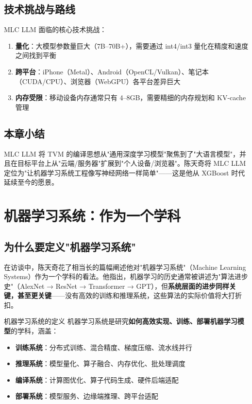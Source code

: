 \documentclass[a4paper]{article}
\begin{document}
\subsection{技术挑战与路线}

MLC LLM 面临的核心技术挑战：

\begin{enumerate}
\item \textbf{量化}：大模型参数量巨大（7B--70B+），需要通过 int4/int3 量化在精度和速度之间找到平衡
\item \textbf{跨平台}：iPhone（Metal）、Android（OpenCL/Vulkan）、笔记本（CUDA/CPU）、浏览器（WebGPU）各平台差异巨大
\item \textbf{内存受限}：移动设备内存通常只有 4--8GB，需要精细的内存规划和 KV-cache 管理
\end{enumerate}

\subsection{本章小结}

MLC LLM 将 TVM 的编译思想从"通用深度学习模型"聚焦到了"大语言模型"，并且在目标平台上从"云端/服务器"扩展到"个人设备/浏览器"。陈天奇将 MLC LLM 定位为"让机器学习系统工程像写神经网络一样简单"——这是他从 XGBoost 时代延续至今的愿景。


\section{机器学习系统：作为一个学科}

\subsection{为什么要定义"机器学习系统"}

在访谈中，陈天奇花了相当长的篇幅阐述他对"机器学习系统"（Machine Learning Systems）作为一个学科的看法。他指出，机器学习的历史通常被讲述为"算法进步史"（AlexNet → ResNet → Transformer → GPT），但\textbf{系统层面的进步同样关键，甚至更关键}——没有高效的训练和推理系统，这些算法的实际价值将大打折扣。

\begin{importantbox}{机器学习系统的定义}
机器学习系统是研究\textbf{如何高效实现、训练、部署机器学习模型}的学科，涵盖：
\begin{itemize}
\item \textbf{训练系统}：分布式训练、混合精度、梯度压缩、流水线并行
\item \textbf{推理系统}：模型量化、算子融合、内存优化、批处理调度
\item \textbf{编译系统}：计算图优化、算子代码生成、硬件后端适配
\item \textbf{部署系统}：模型服务、边缘端推理、跨平台适配
\end{itemize}
\end{importantbox}
\end{document}

